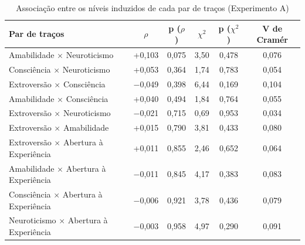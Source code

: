 \begin{table}[htb]
    \caption{Associação entre os níveis induzidos de cada par de traços (Experimento A)}
    \label{tab:aleat-independencia}
    \centering
    \footnotesize
    \begin{tabular}{lccccc}
        \toprule
        Par de traços & $\rho$ & p ($\rho$) & $\chi^2$ & p ($\chi^2$) & V de Cramér \\
        \midrule
        Amabilidade $\times$ Neuroticismo & +0,103 & 0,075 & 3,50 & 0,478 & 0,076 \\
        Consciência $\times$ Neuroticismo & +0,053 & 0,364 & 1,74 & 0,783 & 0,054 \\
        Extroversão $\times$ Consciência & $-$0,049 & 0,398 & 6,44 & 0,169 & 0,104 \\
        Amabilidade $\times$ Consciência & +0,040 & 0,494 & 1,84 & 0,764 & 0,055 \\
        Extroversão $\times$ Neuroticismo & $-$0,021 & 0,715 & 0,69 & 0,953 & 0,034 \\
        Extroversão $\times$ Amabilidade & +0,015 & 0,790 & 3,81 & 0,433 & 0,080 \\
        Extroversão $\times$ Abertura à Experiência & +0,011 & 0,855 & 2,46 & 0,652 & 0,064 \\
        Amabilidade $\times$ Abertura à Experiência & $-$0,011 & 0,845 & 4,17 & 0,383 & 0,083 \\
        Consciência $\times$ Abertura à Experiência & $-$0,006 & 0,921 & 3,78 & 0,436 & 0,079 \\
        Neuroticismo $\times$ Abertura à Experiência & $-$0,003 & 0,958 & 4,97 & 0,290 & 0,091 \\
        \bottomrule
    \end{tabular}
\end{table}

